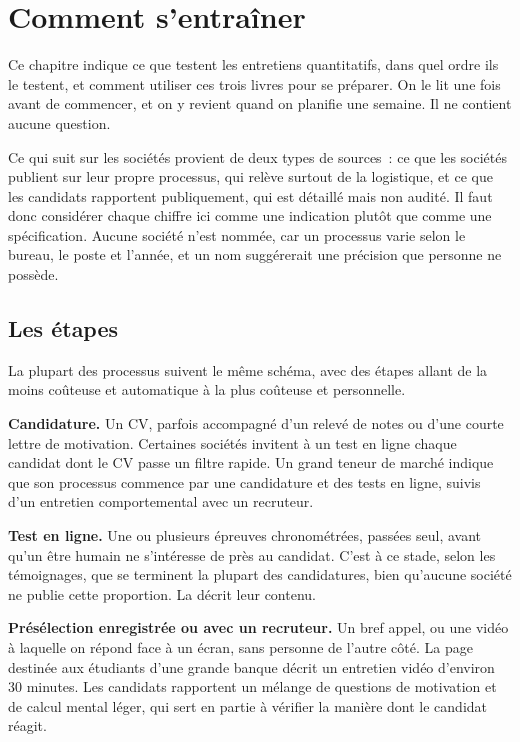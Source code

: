 \chapter{Comment s'entraîner}\label{ch:iv1:how-to-train}

Ce chapitre indique ce que testent les entretiens quantitatifs, dans quel ordre ils le testent, et comment utiliser ces trois livres pour se préparer. On le lit une fois avant de commencer, et on y revient quand on planifie une semaine. Il ne contient aucune question.

Ce qui suit sur les sociétés provient de deux types de sources~: ce que les sociétés publient sur leur propre processus, qui relève surtout de la logistique, et ce que les candidats rapportent publiquement, qui est détaillé mais non audité. Il faut donc considérer chaque chiffre ici comme une indication plutôt que comme une spécification. Aucune société n'est nommée, car un processus varie selon le bureau, le poste et l'année, et un nom suggérerait une précision que personne ne possède.

\section{Les étapes}

La plupart des processus suivent le même schéma, avec des étapes allant de la moins coûteuse et automatique à la plus coûteuse et personnelle.

\textbf{Candidature.} Un CV, parfois accompagné d'un relevé de notes ou d'une courte lettre de motivation. Certaines sociétés invitent à un test en ligne chaque candidat dont le CV passe un filtre rapide. Un grand teneur de marché indique que son processus commence par une candidature et des tests en ligne, suivis d'un entretien comportemental avec un recruteur.

\textbf{Test en ligne.} Une ou plusieurs épreuves chronométrées, passées seul, avant qu'un être humain ne s'intéresse de près au candidat. C'est à ce stade, selon les témoignages, que se terminent la plupart des candidatures, bien qu'aucune société ne publie cette proportion. La  décrit leur contenu.

\textbf{Présélection enregistrée ou avec un recruteur.} Un bref appel, ou une vidéo à laquelle on répond face à un écran, sans personne de l'autre côté. La page destinée aux étudiants d'une grande banque décrit un entretien vidéo d'environ 30 minutes. Les candidats rapportent un mélange de questions de motivation et de calcul mental léger, qui sert en partie à vérifier la manière dont le candidat réagit.


